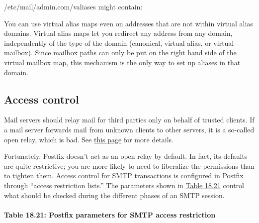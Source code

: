 
{/etc/mail/admin.com/valiases} might contain:


You can use virtual alias maps even on addresses that are not within
virtual alias domains. Virtual alias maps let you redirect any address
from any domain, independently of the type of the domain (canonical,
virtual alias, or virtual mailbox). Since mailbox paths can only be put
on the right hand side of the virtual mailbox map, this mechanism is the
only way to set up aliases in that domain.

\protect\hypertarget{part0026_split_063.html}{}{}

\hypertarget{part0026_split_063.htmlux5cux23_idContainer1247}{}
\hypertarget{part0026_split_063.htmlux5cux23calibre_pb_62}{%
\subsection[Access
control]{\texorpdfstring{\protect\hypertarget{part0026_split_063.htmlux5cux23_idTextAnchor1187}{}{}Access
control}{Access control}}\label{part0026_split_063.htmlux5cux23calibre_pb_62}}

\protect\hypertarget{part0026_split_063.htmlux5cux23_idIndexMarker2726}{}{}Mail
servers should relay mail for third parties only on behalf of trusted
clients. If a mail server forwards mail from unknown clients to other
servers, it is a so-called open relay, which is bad. See
\protect\hyperlink{part0026_split_037.htmlux5cux23_idTextAnchor1093}{this
page} for more details.

Fortunately, Postfix doesn't act as an open relay by default. In fact,
its defaults are quite restrictive; you are more likely to need to
liberalize the permissions than to tighten them. Access control for SMTP
transactions is configured in Postfix through ``access restriction
lists.'' The parameters shown in
\protect\hyperlink{part0026_split_063.htmlux5cux23_idTextAnchor1188}{Table
18.21} control what should be checked during the different phases of an
SMTP session.

\paragraph[{Table 18.21: }Postfix parameters for SMTP access
restriction]{\texorpdfstring{{Table 18.21:
}\protect\hypertarget{part0026_split_063.htmlux5cux23_idTextAnchor1188}{}{}Postfix
parameters for SMTP access
restriction{\protect\hypertarget{part0026_split_063.htmlux5cux23_idIndexMarker2727}{}{}}}{Table 18.21: Postfix parameters for SMTP access restriction}}

